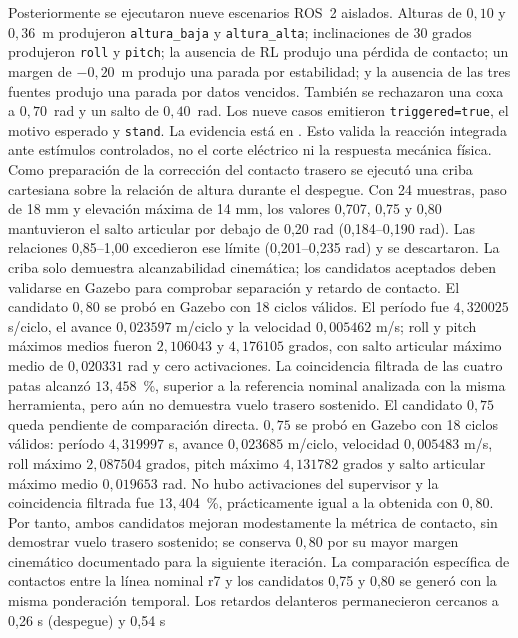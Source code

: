 Posteriormente se ejecutaron nueve escenarios ROS~2 aislados. Alturas de
$0{,}10$ y $0{,}36$~m produjeron \texttt{altura\_baja} y
\texttt{altura\_alta}; inclinaciones de 30 grados produjeron \texttt{roll} y
\texttt{pitch}; la ausencia de RL produjo una pérdida de contacto; un margen
de $-0{,}20$~m produjo una parada por estabilidad; y la ausencia de las tres
fuentes produjo una parada por datos vencidos. También se rechazaron una coxa a
$0{,}70$~rad y un salto de $0{,}40$~rad. Los nueve casos emitieron
\texttt{triggered=true}, el motivo esperado y \texttt{stand}. La evidencia está
en . Esto valida
la reacción integrada ante estímulos controlados, no el corte eléctrico ni la
respuesta mecánica física.
Como preparación de la corrección del contacto trasero se ejecutó una criba
cartesiana sobre la relación de altura durante el despegue. Con 24 muestras,
paso de 18 mm y elevación máxima de 14 mm, los valores 0,707, 0,75 y 0,80
mantuvieron el salto articular por debajo de 0,20 rad (0,184--0,190 rad). Las
relaciones 0,85--1,00 excedieron ese límite (0,201--0,235 rad) y se descartaron.
La criba solo demuestra alcanzabilidad cinemática; los candidatos aceptados
deben validarse en Gazebo para comprobar separación y retardo de contacto.
El candidato $0{,}80$ se probó en Gazebo con 18 ciclos válidos. El período fue
$4{,}320025$ s/ciclo, el avance $0{,}023597$ m/ciclo y la velocidad
$0{,}005462$ m/s; roll y pitch máximos medios fueron $2{,}106043$ y
$4{,}176105$ grados, con salto articular máximo medio de $0{,}020331$ rad y
cero activaciones. La coincidencia filtrada de las cuatro patas alcanzó
$13{,}458$~\%, superior a la referencia nominal analizada con la misma
herramienta, pero aún no demuestra vuelo trasero sostenido. El candidato
$0{,}75$ queda pendiente de comparación directa.
$0{,}75$ se probó en Gazebo con 18 ciclos válidos: período $4{,}319997$ s,
avance $0{,}023685$ m/ciclo, velocidad $0{,}005483$ m/s, roll máximo
$2{,}087504$ grados, pitch máximo $4{,}131782$ grados y salto articular máximo
medio $0{,}019653$ rad. No hubo activaciones del supervisor y la coincidencia
filtrada fue $13{,}404$~\%, prácticamente igual a la obtenida con $0{,}80$.
Por tanto, ambos candidatos mejoran modestamente la métrica de contacto, sin
demostrar vuelo trasero sostenido; se conserva $0{,}80$ por su mayor margen
cinemático documentado para la siguiente iteración.
La comparación específica de contactos entre la línea nominal r7 y los
candidatos 0,75 y 0,80 se generó con la misma ponderación temporal. Los
retardos delanteros permanecieron cercanos a 0,26 s (despegue) y 0,54 s
